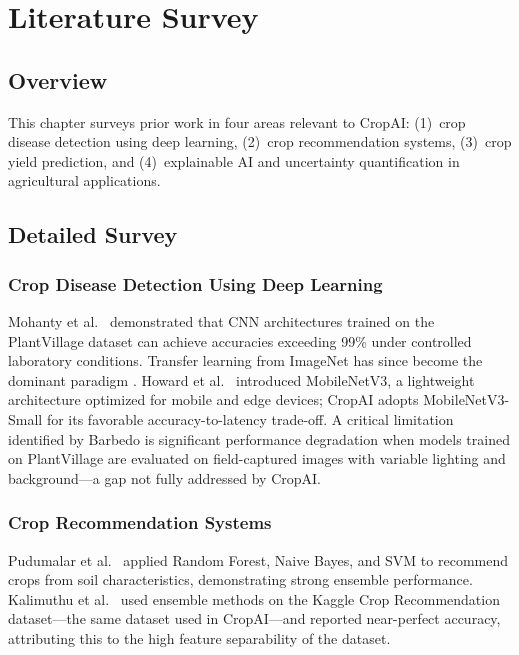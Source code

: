 \documentclass[12pt,a4paper]{report}
\begin{document}
\chapter{Literature Survey}

\section{Overview}
This chapter surveys prior work in four areas relevant to CropAI: (1)~crop disease detection using deep learning, (2)~crop recommendation systems, (3)~crop yield prediction, and (4)~explainable AI and uncertainty quantification in agricultural applications.

\section{Detailed Survey}

\subsection{Crop Disease Detection Using Deep Learning}
Mohanty et al.\ \cite{mohanty2016using} demonstrated that CNN architectures trained on the PlantVillage dataset \cite{hughes2015open} can achieve accuracies exceeding 99\% under controlled laboratory conditions. Transfer learning from ImageNet \cite{deng2009imagenet} has since become the dominant paradigm \cite{too2019comparative}. Howard et al.\ \cite{howard2019searching} introduced MobileNetV3, a lightweight architecture optimized for mobile and edge devices; CropAI adopts MobileNetV3-Small for its favorable accuracy-to-latency trade-off. A critical limitation identified by Barbedo \cite{barbedo2018factors} is significant performance degradation when models trained on PlantVillage are evaluated on field-captured images with variable lighting and background---a gap not fully addressed by CropAI.

\subsection{Crop Recommendation Systems}
Pudumalar et al.\ \cite{pudumalar2017crop} applied Random Forest, Naive Bayes, and SVM to recommend crops from soil characteristics, demonstrating strong ensemble performance. Kalimuthu et al.\ \cite{kalimuthu2020crop} used ensemble methods on the Kaggle Crop Recommendation dataset---the same dataset used in CropAI---and reported near-perfect accuracy, attributing this to the high feature separability of the dataset.
\end{document}
